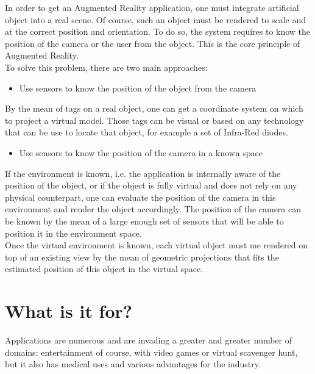 In order to get an Augmented Reality application, one must integrate artificial object into a real scene. Of course, such an object must be rendered to scale and at the correct position and orientation. To do so, the system requires to know the position of the camera or the user from the object. This is the core principle of Augmented Reality.\\

To solve this problem, there are two main approaches:

\begin{itemize}
\item{Use sensors to know the position of the object from the camera}
\end{itemize}

By the mean of tags on a real object, one can get a coordinate system on which to project a virtual model. Those tags can be visual or based on any technology that can be use to locate that object, for example a set of Infra-Red diodes.

\begin{itemize}
\item{Use sensors to know the position of the camera in a known space}
\end{itemize}

If the environment is known, i.e. the application is internally aware of the position of the object, or if the object is fully virtual and does not rely on any physical counterpart, one can evaluate the position of the camera in this environment and render the object accordingly. The position of the camera can be known by the mean of a large enough set of sensors that will be able to position it in the environment space.\\

Once the virtual environment is known, each virtual object must me rendered on top of an existing view by the mean of geometric projections that fits the estimated position of this object in the virtual space.

\section{What is it for?}
\label{sec:what_is_ar_for}

Applications are numerous and are invading a greater and greater number of domains: entertainment of course, with video games or virtual scavenger hunt, but it also has medical uses and various advantages for the industry.